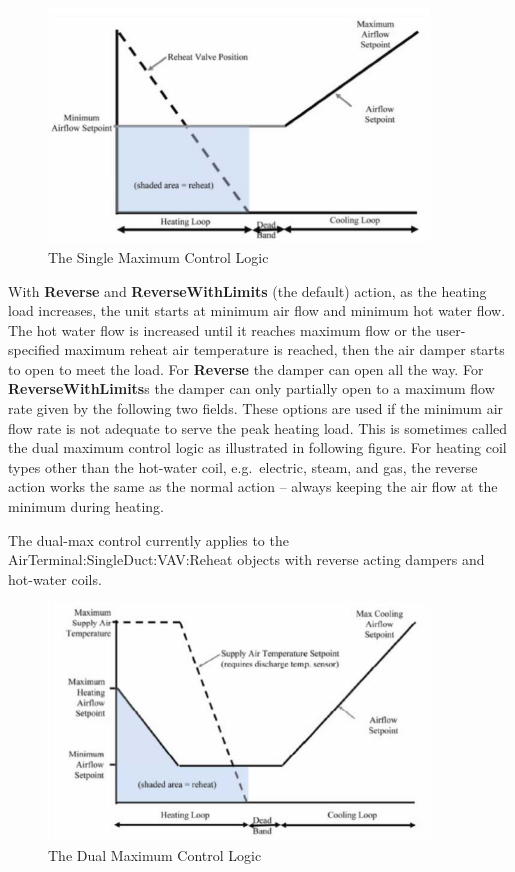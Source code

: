 \begin{figure}[hbtp] %
\centering
\includegraphics[width=0.9\textwidth, height=0.9\textheight, keepaspectratio=true]{media/image264.png}
\caption{The Single Maximum Control Logic \protect \label{fig:the-single-maximum-control-logic}}
\end{figure}

With \textbf{Reverse} and \textbf{ReverseWithLimits} (the default) action, as the heating load increases, the unit starts at minimum air flow and minimum hot water flow. The hot water flow is increased until it reaches maximum flow or the user-specified maximum reheat air temperature is reached, then the air damper starts to open to meet the load. For \textbf{Reverse} the damper can open all the way. For \textbf{ReverseWithLimits}s the damper can only partially open to a maximum flow rate given by the following two fields. These options are used if the minimum air flow rate is not adequate to serve the peak heating load. This is sometimes called the dual maximum control logic as illustrated in following figure. For heating coil types other than the hot-water coil, e.g.~electric, steam, and gas, the reverse action works the same as the normal action -- always keeping the air flow at the minimum during heating.

The dual-max control currently applies to the AirTerminal:SingleDuct:VAV:Reheat objects with reverse acting dampers and hot-water coils.

\begin{figure}[hbtp] %
\centering
\includegraphics[width=0.9\textwidth, height=0.9\textheight, keepaspectratio=true]{media/image265.png}
\caption{  The Dual Maximum Control Logic \protect \label{fig:the-dual-maximum-control-logic}}
\end{figure}

